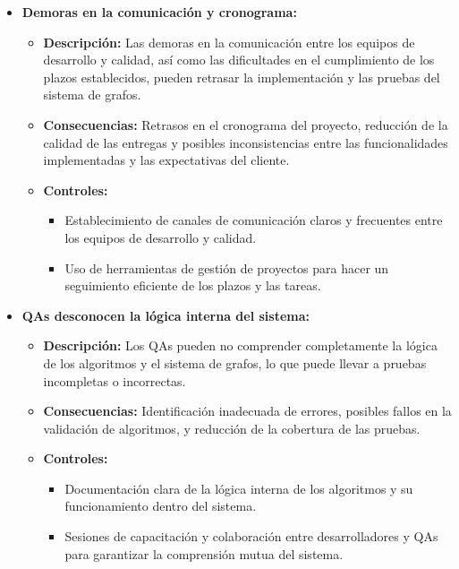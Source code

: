 \documentclass[stu, 12pt, letterpaper, donotrepeattitle, floatsintext, natbib]{apa7}
\begin{document}
\begin{itemize}

    \item \textbf{Demoras en la comunicación y cronograma:}
    \begin{itemize}
        \item \textbf{Descripción:} Las demoras en la comunicación entre los equipos de desarrollo y calidad, así como las dificultades en el cumplimiento de los plazos establecidos, pueden retrasar la implementación y las pruebas del sistema de grafos.
        \item \textbf{Consecuencias:} Retrasos en el cronograma del proyecto, reducción de la calidad de las entregas y posibles inconsistencias entre las funcionalidades implementadas y las expectativas del cliente.
        \item \textbf{Controles:}
        \begin{itemize}
            \item Establecimiento de canales de comunicación claros y frecuentes entre los equipos de desarrollo y calidad.
            \item Uso de herramientas de gestión de proyectos para hacer un seguimiento eficiente de los plazos y las tareas.
        \end{itemize}
    \end{itemize}

    \item \textbf{QAs desconocen la lógica interna del sistema:}
    \begin{itemize}
        \item \textbf{Descripción:} Los QAs pueden no comprender completamente la lógica de los algoritmos y el sistema de grafos, lo que puede llevar a pruebas incompletas o incorrectas.
        \item \textbf{Consecuencias:} Identificación inadecuada de errores, posibles fallos en la validación de algoritmos, y reducción de la cobertura de las pruebas.
        \item \textbf{Controles:}
        \begin{itemize}
            \item Documentación clara de la lógica interna de los algoritmos y su funcionamiento dentro del sistema.
            \item Sesiones de capacitación y colaboración entre desarrolladores y QAs para garantizar la comprensión mutua del sistema.
        \end{itemize}
    \end{itemize}


\end{itemize}
\end{document}
